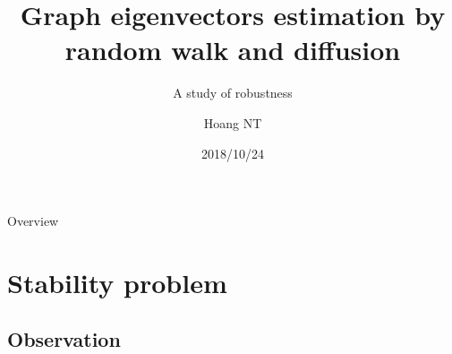 \documentclass[handout]{beamer}
\title{Graph eigenvectors estimation by random walk and diffusion}
\subtitle{A study of robustness}
\author{Hoang NT}
\institute{Murata Laboratory \\ Tokyo Tech \vspace{4em}}
\date{2018/10/24}
\begin{document}
    \begin{frame}
        \maketitle
    \end{frame}

    \begin{frame}{Overview}
        \tableofcontents
    \end{frame}
    
    \section{Stability problem}

    \subsection{Observation}
\end{document}

